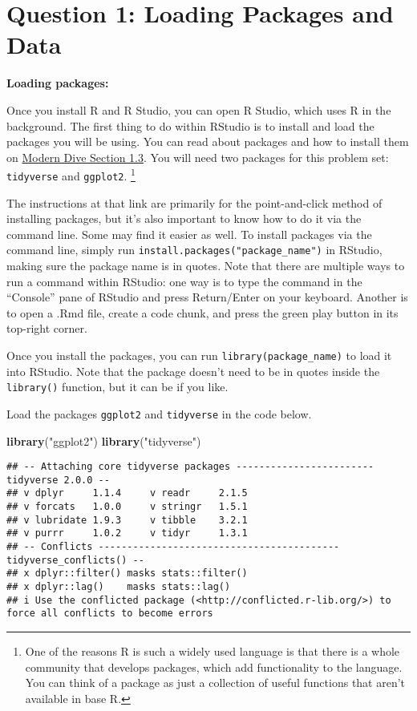 \documentclass[
]{article}
\newenvironment{Shaded}{\begin{snugshade}}{\end{snugshade}}
\newcommand{\FunctionTok}[1]{\textcolor[rgb]{0.13,0.29,0.53}{\textbf{#1}}}
\newcommand{\NormalTok}[1]{#1}
\newcommand{\StringTok}[1]{\textcolor[rgb]{0.31,0.60,0.02}{#1}}
\begin{document}
\section{Question 1: Loading Packages and
Data}\label{question-1-loading-packages-and-data}

\textbf{Loading packages:}

Once you install R and R Studio, you can open R Studio, which uses R in
the background. The first thing to do within RStudio is to install and
load the packages you will be using. You can read about packages and how
to install them on
\href{https://moderndive.netlify.app/1-getting-started.html\#packages}{Modern
Dive Section 1.3}. You will need two packages for this problem set:
\texttt{tidyverse} and \texttt{ggplot2}.
\footnote{One of the reasons R is such a widely used language is that there is a whole community that develops packages, which add functionality to the language. You can think of a package as just a collection of useful functions that aren't available in base R.}

The instructions at that link are primarily for the point-and-click
method of installing packages, but it's also important to know how to do
it via the command line. Some may find it easier as well. To install
packages via the command line, simply run
\texttt{install.packages("package\_name")} in RStudio, making sure the
package name is in quotes. Note that there are multiple ways to run a
command within RStudio: one way is to type the command in the
``Console'' pane of RStudio and press Return/Enter on your keyboard.
Another is to open a .Rmd file, create a code chunk, and press the green
play button in its top-right corner.

Once you install the packages, you can run
\texttt{library(package\_name)} to load it into RStudio. Note that the
package doesn't need to be in quotes inside the \texttt{library()}
function, but it can be if you like.

Load the packages \texttt{ggplot2} and \texttt{tidyverse} in the code
below.

\begin{Shaded}
\begin{Highlighting}[]
\FunctionTok{library}\NormalTok{(}\StringTok{"ggplot2"}\NormalTok{)}
\FunctionTok{library}\NormalTok{(}\StringTok{"tidyverse"}\NormalTok{)}
\end{Highlighting}
\end{Shaded}

\begin{verbatim}
## -- Attaching core tidyverse packages ------------------------ tidyverse 2.0.0 --
## v dplyr     1.1.4     v readr     2.1.5
## v forcats   1.0.0     v stringr   1.5.1
## v lubridate 1.9.3     v tibble    3.2.1
## v purrr     1.0.2     v tidyr     1.3.1
## -- Conflicts ------------------------------------------ tidyverse_conflicts() --
## x dplyr::filter() masks stats::filter()
## x dplyr::lag()    masks stats::lag()
## i Use the conflicted package (<http://conflicted.r-lib.org/>) to force all conflicts to become errors
\end{verbatim}
\end{document}
